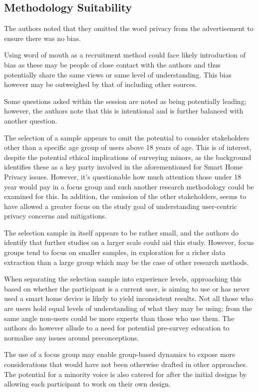 \subsection{Methodology Suitability}

The authors noted that they omitted the word privacy from the advertisement to ensure there was no bias.

Using word of mouth as a recruitment method could face likely introduction of bias as these may be people of close contact with the authors and thus potentially share the same views or same level of understanding. This bias however may be outweighed by that of including other sources.

Some questions asked within the session are noted as being potentially leading; however, the authors note that this is intentional and is further balanced with another question.

The selection of a sample appears to omit the potential to consider stakeholders other than a specific age group of users above 18 years of age. This is of interest, despite the potential ethical implications of surveying minors, as the background identifies these as a key party involved in the aforementioned for Smart Home Privacy issues. However, it's questionable how much attention those under 18 year would pay in a focus group and such another research methodology could be examined for this. In addition, the omission of the other stakeholders, seems to have allowed a greater focus on the study goal of understanding user-centric privacy concerns and mitigations.

The selection sample in itself appears to be rather small, and the authors do identify that further studies on a larger scale could aid this study. However, focus groups tend to focus on smaller samples, in exploration for a richer data extraction than a large group which may be the case of other research methods.

When separating the selection sample into experience levels, approaching this based on whether the participant is a current user, is aiming to use or has never used a smart home device is likely to yield inconsistent results. Not all those who are users hold equal levels of understanding of what they may be using; from the same angle non-users could be more experts than those who use them. The authors do however allude to a need for potential pre-survey education to normalise any issues around preconceptions.

The use of a focus group may enable group-based dynamics to expose more considerations that would have not been otherwise drafted in other approaches. The potential for a minority voice is also catered for after the initial designs by allowing each participant to work on their own design.

